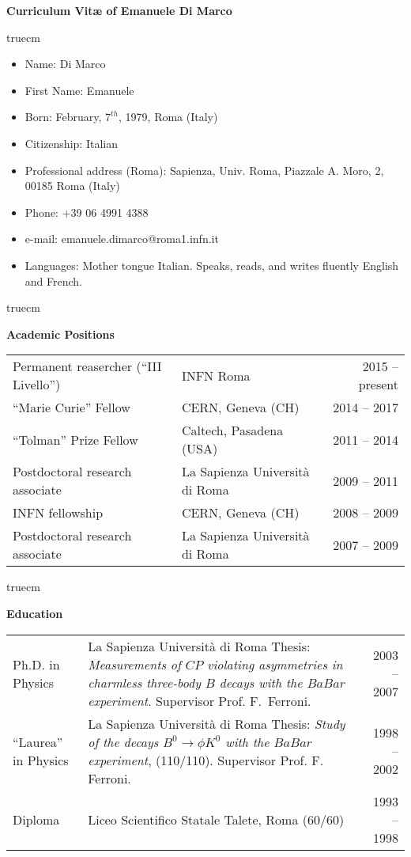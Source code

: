 \documentclass[11pt,twoside,a4paper]{article}
\begin{document}
\large
\centerline{\bf Curriculum Vit\ae{} of Emanuele Di Marco}

 truecm

\begin{itemize} 
\item  Name:  Di Marco
\item  First Name: Emanuele
\item  Born: February, $7^{th}$, 1979, Roma (Italy)
\item  Citizenship: Italian
\item  Professional address (Roma): Sapienza, Univ. Roma, Piazzale A. Moro, 2, 00185 Roma (Italy) 
\item  Phone: +39 06 4991 4388
\item  e-mail: emanuele.dimarco@roma1.infn.it
\item  Languages: Mother tongue Italian. Speaks, reads, and writes fluently English and French. 
\end{itemize}

 truecm

\begin{center}
{\bf{Academic Positions}}
\end{center}
\begin{tabular}{llr}
Permanent reasercher (``III Livello'') & INFN Roma & 2015 -- present \\
``Marie Curie'' Fellow & CERN, Geneva (CH) & 2014 -- 2017 \\
``Tolman'' Prize Fellow & Caltech, Pasadena (USA) & 2011 -- 2014 \\
Postdoctoral research associate & La Sapienza Universit\`a di Roma & 2009 -- 2011 \\
INFN fellowship & CERN, Geneva (CH) & 2008 -- 2009 \\
Postdoctoral research associate & La Sapienza Universit\`a di Roma & 2007 -- 2009 \\
\end{tabular}


 truecm


\begin{center}
{\bf{Education}}
\end{center}
\begin{tabular}{lp{11cm}r}
  Ph.D. in Physics & La Sapienza Universit\`a di Roma 
  \newline Thesis: {\it Measurements of $CP$ violating asymmetries in
    charmless three-body $B$ decays with the $BaBar$ experiment}.
  Supervisor Prof. F.~Ferroni. & 2003 -- 2007 \\
  ``Laurea'' in Physics & La Sapienza Universit\`a di Roma 
  \newline Thesis: {\it Study of the decays $B^0 \rightarrow \phi K^0$ with the $BaBar$ experiment},
  (110/110). Supervisor Prof. F. Ferroni. & 1998 -- 2002 \\
  Diploma & Liceo Scientifico Statale Talete, Roma (60/60) & 1993 -- 1998 \\
\end{tabular}
\end{document}
